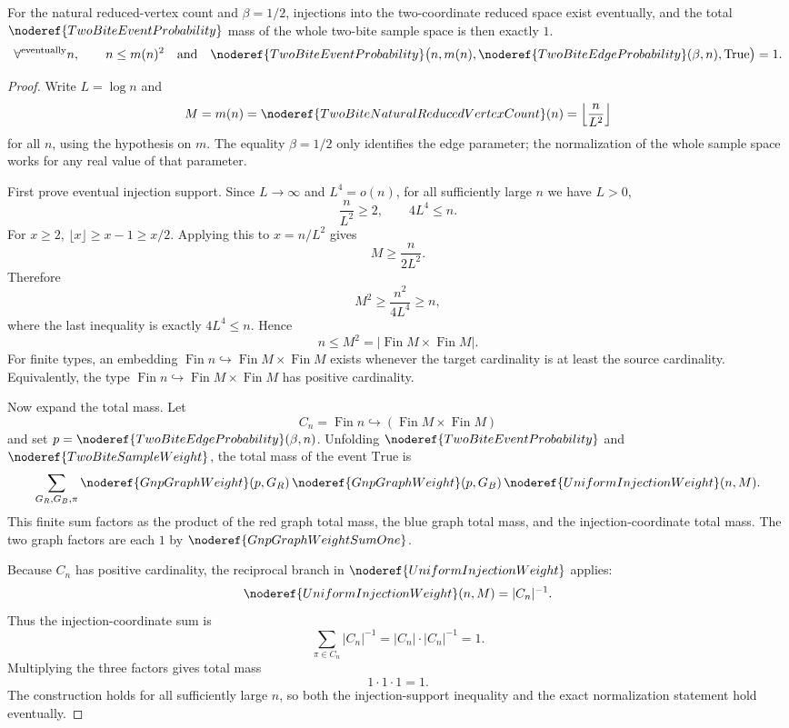 \begin{helper}
For the natural reduced-vertex count and \(\beta=1/2\), injections into the
two-coordinate reduced space exist eventually, and the total
\(\noderef{TwoBiteEventProbability}\) mass of the whole two-bite sample space
is then exactly \(1\).
\[
\forall^{\mathrm{eventually}} n,\qquad
n\le m(n)^2
\quad\text{and}\quad
\noderef{TwoBiteEventProbability}
  \bigl(n,m(n),\noderef{TwoBiteEdgeProbability}(\beta,n),\mathrm{True}\bigr)=1.
\]
\end{helper}
\begin{proof}
Write \(L=\log n\) and
\[
M=m(n)=\noderef{TwoBiteNaturalReducedVertexCount}(n)
  =\left\lfloor \frac{n}{L^2}\right\rfloor
\]
for all \(n\), using the hypothesis on \(m\).  The equality
\(\beta=1/2\) only identifies the edge parameter; the normalization of the
whole sample space works for any real value of that parameter.

First prove eventual injection support.  Since \(L\to\infty\) and
\(L^4=o(n)\), for all sufficiently large \(n\) we have \(L>0\),
\[
\frac{n}{L^2}\ge2,\qquad 4L^4\le n .
\]
For \(x\ge2\), \(\lfloor x\rfloor\ge x-1\ge x/2\).  Applying this to
\(x=n/L^2\) gives
\[
M\ge \frac{n}{2L^2}.
\]
Therefore
\[
M^2\ge \frac{n^2}{4L^4}\ge n,
\]
where the last inequality is exactly \(4L^4\le n\).  Hence
\[
n\le M^2=|\operatorname{Fin}M\times\operatorname{Fin}M|.
\]
For finite types, an embedding \(\operatorname{Fin} n\hookrightarrow
\operatorname{Fin}M\times\operatorname{Fin}M\) exists whenever the target
cardinality is at least the source cardinality.  Equivalently, the type
\(\operatorname{Fin} n\hookrightarrow\operatorname{Fin}M\times\operatorname{Fin}M\)
has positive cardinality.

Now expand the total mass.  Let
\[
C_n=\operatorname{Fin} n\hookrightarrow(\operatorname{Fin}M\times
\operatorname{Fin}M)
\]
and set \(p=\noderef{TwoBiteEdgeProbability}(\beta,n)\).  Unfolding
\(\noderef{TwoBiteEventProbability}\) and
\(\noderef{TwoBiteSampleWeight}\), the total mass of the event
\(\mathrm{True}\) is
\[
\sum_{G_R,G_B,\pi}
\noderef{GnpGraphWeight}(p,G_R)\,
\noderef{GnpGraphWeight}(p,G_B)\,
\noderef{UniformInjectionWeight}(n,M).
\]
This finite sum factors as the product of the red graph total mass, the blue
graph total mass, and the injection-coordinate total mass.  The two graph
factors are each \(1\) by \(\noderef{GnpGraphWeightSumOne}\).

Because \(C_n\) has positive cardinality, the reciprocal branch in
\(\noderef{UniformInjectionWeight}\) applies:
\[
\noderef{UniformInjectionWeight}(n,M)=|C_n|^{-1}.
\]
Thus the injection-coordinate sum is
\[
\sum_{\pi\in C_n}|C_n|^{-1}
  = |C_n|\cdot |C_n|^{-1}=1.
\]
Multiplying the three factors gives total mass
\[
1\cdot1\cdot1=1.
\]
The construction holds for all sufficiently large \(n\), so both the
injection-support inequality and the exact normalization statement hold
eventually.
\end{proof}
